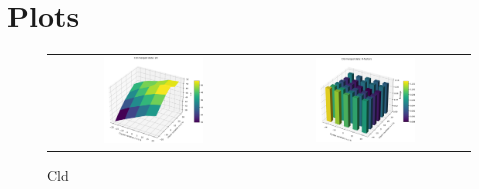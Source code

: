 \newpage
\section{Plots}

\begin{figure}[h]
    \centering
    \begin{tabular}{cc}
    \includegraphics[width = 0.5\textwidth]{plots/exp0/cld_merged_Isig.png} & \includegraphics[width = 0.5\textwidth]{plots/exp0/cld_merged_rmerge.png} %
    \end{tabular}
    \caption{Cld}
    \label{fig:cld_stats}
\end{figure}

